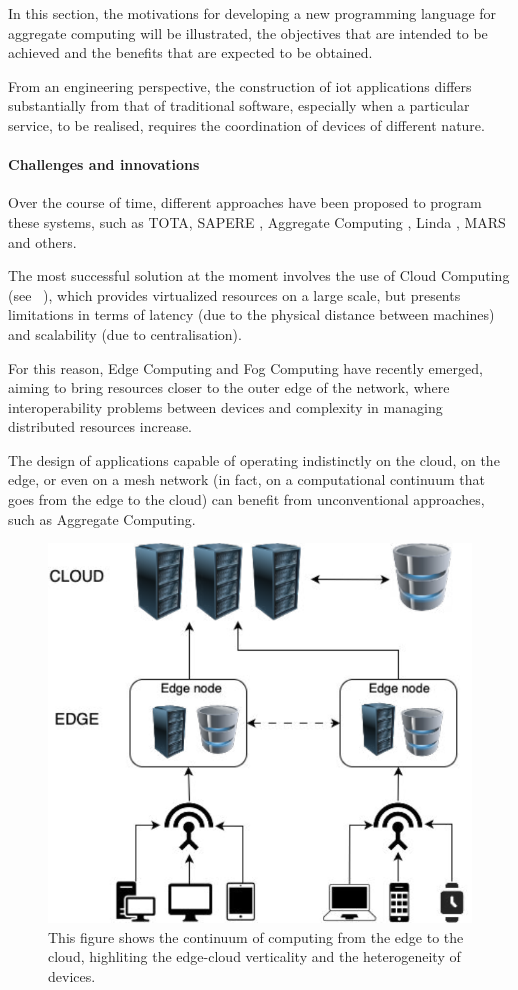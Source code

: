 In this section, the motivations for developing a new programming language for aggregate computing will be illustrated,
the objectives that are intended to be achieved and the benefits that are expected to be obtained.

From an engineering perspective, the construction of \ac{iot} applications differs substantially from that of traditional
software, especially when a particular service, to be realised, requires the coordination of devices of different nature.

\paragraph{Challenges and innovations}
Over the course of time, different approaches have been proposed to program these systems, such as TOTA, SAPERE \cite{ZAMBONELLI2011197},
Aggregate Computing \cite{Beal2016}, Linda \cite{10.1145/2363.2433}, MARS \cite{865084} and others.

The most successful solution at the moment involves the use of Cloud Computing (see ~),
which provides virtualized resources on a large scale, but presents limitations in terms of latency (due to the physical
distance between machines) and scalability (due to centralisation).

For this reason, Edge Computing and Fog Computing have recently emerged, aiming to bring resources closer to the outer
edge of the network, where interoperability problems between devices and complexity in managing distributed resources increase.

The design of applications capable of operating indistinctly on the cloud, on the edge, or even on a mesh network
(in fact, on a computational continuum that goes from the edge to the cloud) can benefit from unconventional approaches,
such as Aggregate Computing.

\begin{figure}
    \centering
    \includegraphics[width=.5\linewidth]{figures/edge-cloud}
    \caption{This figure shows the continuum of computing from the edge to the cloud, highliting the edge-cloud verticality
    and the heterogeneity of devices.}
    \label{fig:cloud-edge-continuum}
\end{figure}

